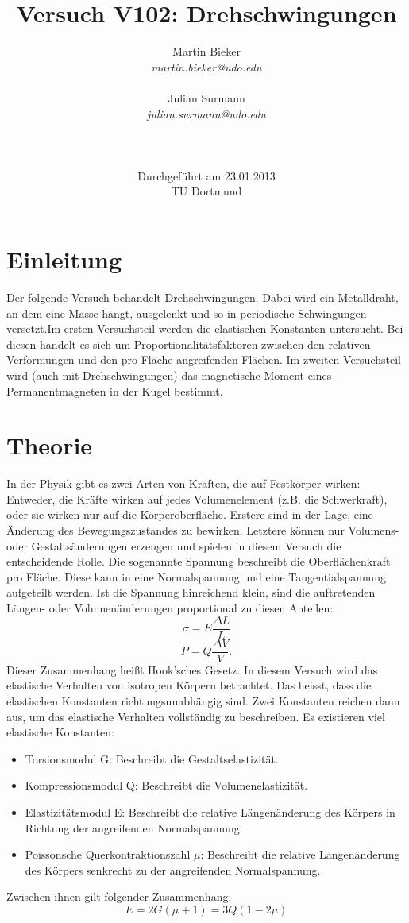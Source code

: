 \documentclass[11pt,ngerman,a4paper]{article}
\title{\textbf{Versuch V102: Drehschwingungen}}
\author{Martin Bieker\\
		\textit{martin.bieker@udo.edu}\\\\
		Julian Surmann\\
		\textit{julian.surmann@udo.edu}\\
		\\\\\\
		Durchgef\"{u}hrt am 23.01.2013\\
		TU Dortmund}
\date{}
\begin{document}
\renewcommand\tablename{Tabelle}
\renewcommand\figurename{Abbildung}
\maketitle
\thispagestyle{empty}
\newpage
\clearpage
\setcounter{page}{1}

\section{Einleitung}
Der folgende Versuch behandelt Drehschwingungen. Dabei wird ein Metalldraht, an dem eine Masse hängt, ausgelenkt und so in periodische Schwingungen versetzt.Im ersten Versuchsteil werden die elastischen Konstanten untersucht. Bei diesen handelt es sich um Proportionalitätsfaktoren zwischen den relativen Verformungen und den pro Fläche angreifenden Flächen.
Im zweiten Versuchsteil wird (auch mit Drehschwingungen) das magnetische Moment eines Permanentmagneten in der Kugel bestimmt.
\section{Theorie}
In der Physik gibt es zwei Arten von Kräften, die auf Festkörper wirken: Entweder, die Kräfte wirken auf jedes Volumenelement (z.B. die Schwerkraft), oder sie wirken nur auf die Körperoberfläche. Erstere sind in der Lage, eine Änderung des Bewegungszustandes zu bewirken. Letztere können nur Volumens- oder Gestaltsänderungen erzeugen und spielen in diesem Versuch die entscheidende Rolle. Die sogenannte Spannung beschreibt die Oberflächenkraft pro Fläche. Diese kann in eine Normalspannung und eine Tangentialspannung aufgeteilt werden. Ist die Spannung hinreichend klein, sind die auftretenden Längen- oder Volumenänderungen proportional zu diesen Anteilen:
\begin{equation}
\label{1}
\sigma = E\frac{\Delta L}{L}
\end{equation}
\begin{equation}
\label{2}
P = Q\frac{\Delta V}{V}.
\end{equation}
Dieser Zusammenhang heißt Hook'sches Gesetz.\newline
In diesem Versuch wird das elastische Verhalten von isotropen Körpern betrachtet. Das heisst, dass die elastischen Konstanten richtungsunabhängig sind. Zwei Konstanten reichen dann aus, um das elastische Verhalten vollständig zu beschreiben. Es existieren viel elastische Konstanten:
\begin{itemize}
\item Torsionsmodul G: Beschreibt die Gestaltselastizität.
\item Kompressionsmodul Q: Beschreibt die Volumenelastizität.
\item Elastizitätsmodul E: Beschreibt die relative Längenänderung des Körpers in Richtung der angreifenden Normalspannung.
\item Poissonsche Querkontraktionszahl $\mu$: Beschreibt die relative Längenänderung des Körpers senkrecht zu der angreifenden Normalspannung.
\end{itemize}
Zwischen ihnen gilt folgender Zusammenhang:
\begin{equation}
E = 2G(\mu+1)=3Q(1-2\mu)
\label{3}
\end{equation}
\end{document}

